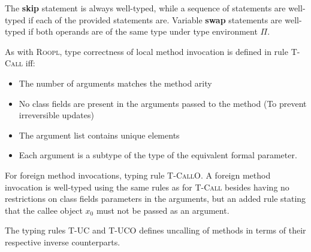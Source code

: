 The \textbf{skip} statement is always well-typed, while a sequence of statements are well-typed if each of the provided statements are. Variable \textbf{swap} statements are well-typed if both operands are of the same type under type environment $\Pi$.

As with \textsc{Roopl}, type correctness of local method invocation is defined in rule \textsc{T-Call} iff:
\begin{itemize}
    \item The number of arguments matches the method arity
    \item No class fields are present in the arguments passed to the method (To prevent irreversible updates)
    \item The argument list contains unique elements
    \item Each argument is a subtype of the type of the equivalent formal parameter. 
\end{itemize}

For foreign method invocations, typing rule \textsc{T-CallO}. A foreign method invocation is well-typed using the same rules as for \textsc{T-Call} besides having no restrictions on class fields parameters in the arguments, but an added rule stating that the callee object $x_0$ must not be passed as an argument.

The typing rules \textsc{T-UC} and \textsc{T-UCO} defines uncalling of methods in terms of their respective inverse counterparts.

